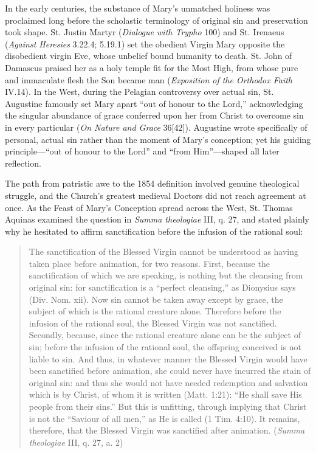 In the early centuries, the substance of Mary's unmatched holiness was proclaimed long before the scholastic terminology of original sin and preservation took shape. St. Justin Martyr (\textit{Dialogue with Trypho} 100) and St. Irenaeus (\textit{Against Heresies} 3.22.4; 5.19.1) set the obedient Virgin Mary opposite the disobedient virgin Eve, whose unbelief bound humanity to death. St. John of Damascus praised her as a holy temple fit for the Most High, from whose pure and immaculate flesh the Son became man (\textit{Exposition of the Orthodox Faith} IV.14). In the West, during the Pelagian controversy over actual sin, St. Augustine famously set Mary apart ``out of honour to the Lord,'' acknowledging the singular abundance of grace conferred upon her from Christ to overcome sin in every particular (\textit{On Nature and Grace} 36[42]). Augustine wrote specifically of personal, actual sin rather than the moment of Mary's conception; yet his guiding principle---``out of honour to the Lord'' and ``from Him''---shaped all later reflection.

The path from patristic awe to the 1854 definition involved genuine theological struggle, and the Church's greatest medieval Doctors did not reach agreement at once. As the Feast of Mary's Conception spread across the West, St. Thomas Aquinas examined the question in \textit{Summa theologiae} III, q. 27, and stated plainly why he hesitated to affirm sanctification before the infusion of the rational soul:

\begin{quote}\small
The sanctification of the Blessed Virgin cannot be understood as having taken place before animation, for two reasons. First, because the sanctification of which we are speaking, is nothing but the cleansing from original sin: for sanctification is a ``perfect cleansing,'' as Dionysius says (Div. Nom. xii). Now sin cannot be taken away except by grace, the subject of which is the rational creature alone. Therefore before the infusion of the rational soul, the Blessed Virgin was not sanctified. Secondly, because, since the rational creature alone can be the subject of sin; before the infusion of the rational soul, the offspring conceived is not liable to sin. And thus, in whatever manner the Blessed Virgin would have been sanctified before animation, she could never have incurred the stain of original sin: and thus she would not have needed redemption and salvation which is by Christ, of whom it is written (Matt. 1:21): ``He shall save His people from their sins.'' But this is unfitting, through implying that Christ is not the ``Saviour of all men,'' as He is called (1 Tim. 4:10). It remains, therefore, that the Blessed Virgin was sanctified after animation. (\textit{Summa theologiae} III, q. 27, a. 2)
\end{quote}

